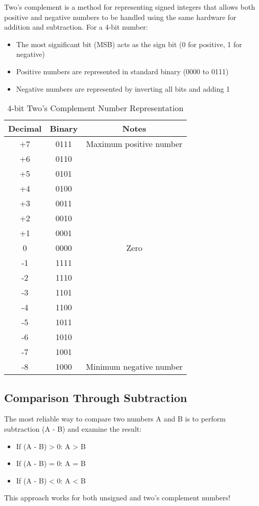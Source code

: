 \documentclass[12pt]{labmanual}
\begin{document}
Two's complement is a method for representing signed integers that allows both positive and negative numbers to be handled using the same hardware for addition and subtraction. For a 4-bit number:
\begin{itemize}
    \item The most significant bit (MSB) acts as the sign bit (0 for positive, 1 for negative)
    \item Positive numbers are represented in standard binary (0000 to 0111)
    \item Negative numbers are represented by inverting all bits and adding 1
\end{itemize}

\begin{table}[H]
    \centering
    \begin{tabular}{|c|c|c|}
    \hline
    \textbf{Decimal} & \textbf{Binary} & \textbf{Notes} \\
    \hline
    +7 & 0111 & Maximum positive number \\
    +6 & 0110 & \\
    +5 & 0101 & \\
    +4 & 0100 & \\
    +3 & 0011 & \\
    +2 & 0010 & \\
    +1 & 0001 & \\
    0 & 0000 & Zero \\
    -1 & 1111 & \\
    -2 & 1110 & \\
    -3 & 1101 & \\
    -4 & 1100 & \\
    -5 & 1011 & \\
    -6 & 1010 & \\
    -7 & 1001 & \\
    -8 & 1000 & Minimum negative number \\
    \hline
    \end{tabular}
    \caption{4-bit Two's Complement Number Representation}
    \label{tab:twos_complement}
\end{table}

\subsection{Comparison Through Subtraction}

\begin{important}[frametitle={Key Concept}]
The most reliable way to compare two numbers A and B is to perform subtraction (A - B) and examine the result:
\begin{itemize}
    \item If (A - B) > 0: A > B
    \item If (A - B) = 0: A = B
    \item If (A - B) < 0: A < B
\end{itemize}
This approach works for both unsigned and two's complement numbers!
\end{important}
\end{document}
